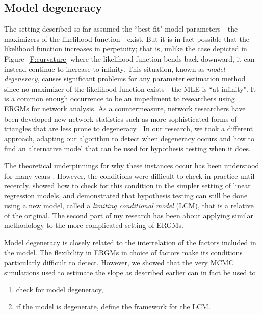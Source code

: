 \documentclass[12pt]{article}
\begin{document}
\subsection{Model degeneracy}
The setting described so far assumed the ``best fit" model parameters---the 
maximizers of the likelihood function---exist.
But it is in fact possible that the likelihood function increases in perpetuity;
that is, unlike the case depicted in Figure~\ref{F:curvature} where 
the likelihood function bends back downward, it can instead continue 
to increase to infinity.  This situation, known as \emph{model degeneracy}, 
causes significant problems for any parameter estimation method since 
no maximizer of the likelihood function exists---the MLE
is ``at infinity".  It is a common enough occurrence to be an impediment to 
researchers using ERGMs for network analysis.
As a countermeasure, network researchers have been developed
 new network statistics such as more sophisticated forms of triangles that are 
less prone to degeneracy \citep{Handcock:degeneracy,advancesp*,recentp*,statnet-tutorial}.
In our research, we took a different approach, adapting our algorithm to detect 
when degeneracy occurs and how to find an alternative model that can 
be used for hypothesis testing when it does.

The theoretical underpinnings for why these instances occur has been 
understood for many years \citep{Barndorff}.  However, the conditions were difficult to check in 
practice until recently.  
\citet{Geyer:gdor} showed how to check for this condition
 in the simpler setting of linear regression models, and demonstrated that 
 hypothesis testing can still be done using a new model, called a 
 \emph{limiting conditional model} (LCM), 
that is a relative of the original.
The second part of my research has been about applying similar methodology to 
the more complicated setting of ERGMs.

Model degeneracy is closely related to the interrelation of the factors 
included in the model.  The flexibility in ERGMs in choice of factors make its 
conditions particularly difficult to detect.  However, we showed that the very MCMC simulations used to estimate the slope as described earlier can in fact be used to 
\begin{enumerate}
\item check for model degeneracy,
\item if the model is degenerate, define the framework for the LCM.
\end{enumerate}
\end{document}
